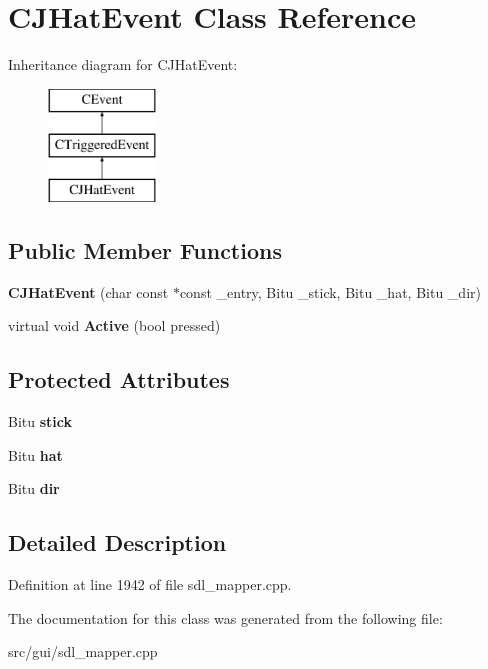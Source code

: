 \hypertarget{classCJHatEvent}{\section{C\-J\-Hat\-Event Class Reference}
\label{classCJHatEvent}
}
Inheritance diagram for C\-J\-Hat\-Event\-:\begin{figure}[H]
\begin{center}
\leavevmode
\includegraphics[height=3.000000cm]{classCJHatEvent}
\end{center}
\end{figure}
\subsection*{Public Member Functions}
\begin{DoxyCompactItemize}
\item 
\hypertarget{classCJHatEvent_a75c1276a13b233799993bb69bfbffedf}{{\bfseries C\-J\-Hat\-Event} (char const $\ast$const \-\_\-entry, Bitu \-\_\-stick, Bitu \-\_\-hat, Bitu \-\_\-dir)}\label{classCJHatEvent_a75c1276a13b233799993bb69bfbffedf}

\item 
\hypertarget{classCJHatEvent_ad4b66a30f706388e5568090963a22dee}{virtual void {\bfseries Active} (bool pressed)}\label{classCJHatEvent_ad4b66a30f706388e5568090963a22dee}

\end{DoxyCompactItemize}
\subsection*{Protected Attributes}
\begin{DoxyCompactItemize}
\item 
\hypertarget{classCJHatEvent_a53d2e407f823a8bd30a2c0d5613cb29b}{Bitu {\bfseries stick}}\label{classCJHatEvent_a53d2e407f823a8bd30a2c0d5613cb29b}

\item 
\hypertarget{classCJHatEvent_a33cb6a20470c519958c6fd0929bcc7cd}{Bitu {\bfseries hat}}\label{classCJHatEvent_a33cb6a20470c519958c6fd0929bcc7cd}

\item 
\hypertarget{classCJHatEvent_a8f7cc4b080b4f6054d6da118209683b7}{Bitu {\bfseries dir}}\label{classCJHatEvent_a8f7cc4b080b4f6054d6da118209683b7}

\end{DoxyCompactItemize}


\subsection{Detailed Description}


Definition at line 1942 of file sdl\-\_\-mapper.\-cpp.



The documentation for this class was generated from the following file\-:\begin{DoxyCompactItemize}
\item 
src/gui/sdl\-\_\-mapper.\-cpp\end{DoxyCompactItemize}
